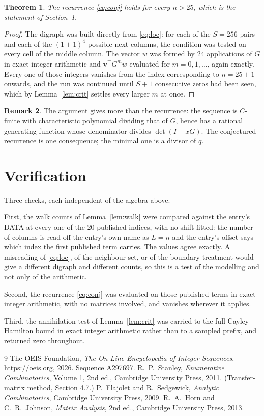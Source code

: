 \documentclass[11pt,a4paper]{article}
\theoremstyle{plain}
\newtheorem{theorem}{Theorem}
\theoremstyle{definition}
\newtheorem{remark}[theorem]{Remark}
\begin{document}
\begin{theorem}
The recurrence \eqref{eq:conj} holds for every $n>25$, which is the statement of
Section~1.
\end{theorem}

\begin{proof}
The digraph was built directly from \eqref{eq:loc}: for each of the $S=256$ pairs and each
of the $(1+1)^{4}$ possible next columns, the condition was tested on every cell of
the middle column. The vector $w$ was formed by $24$ applications of $G$ in exact integer
arithmetic and $\mathbf{v}^{\!\top}G^{m}w$ evaluated for $m=0,1,\dots$, again exactly.
Every one of those integers vanishes from the index corresponding to $n=25+1$ onwards,
and the run was continued until $S+1$ consecutive zeros had been seen, which by
Lemma~\ref{lem:crit} settles every larger $m$ at once.
\end{proof}

\begin{remark}
The argument gives more than the recurrence: the sequence is $C$-finite with characteristic
polynomial dividing that of $G$, hence has a rational generating function whose denominator
divides $\det(I-xG)$. The conjectured recurrence is one consequence; the minimal one is a
divisor of $q$.
\end{remark}

\section{Verification}

Three checks, each independent of the algebra above.

First, the walk counts of Lemma~\ref{lem:walk} were compared against the entry's DATA at
every one of the $20$ published indices, with no shift fitted: the number of columns is
read off the entry's own name as $L=n$ and the entry's offset says which index the first
published term carries. The values agree exactly. A misreading of \eqref{eq:loc}, of the
neighbour set, or of the boundary treatment would give a different digraph and different
counts, so this is a test of the modelling and not only of the arithmetic.

Second, the recurrence \eqref{eq:conj} was evaluated on those published terms in exact
integer arithmetic, with no matrices involved, and vanishes wherever it applies.

Third, the annihilation test of Lemma~\ref{lem:crit} was carried to the full
Cayley--Hamilton bound in exact integer arithmetic rather than to a sampled prefix, and
returned zero throughout.

\begin{thebibliography}{9}
 The OEIS Foundation, \emph{The On-Line Encyclopedia of Integer
Sequences}, \url{https://oeis.org}, 2026. Sequence A297697.
 R.~P.~Stanley, \emph{Enumerative Combinatorics}, Volume 1, 2nd ed.,
Cambridge University Press, 2011. (Transfer-matrix method, Section 4.7.)
 P.~Flajolet and R.~Sedgewick, \emph{Analytic Combinatorics}, Cambridge
University Press, 2009.
 R.~A.~Horn and C.~R.~Johnson, \emph{Matrix Analysis}, 2nd ed., Cambridge
University Press, 2013.
\end{thebibliography}
\end{document}
